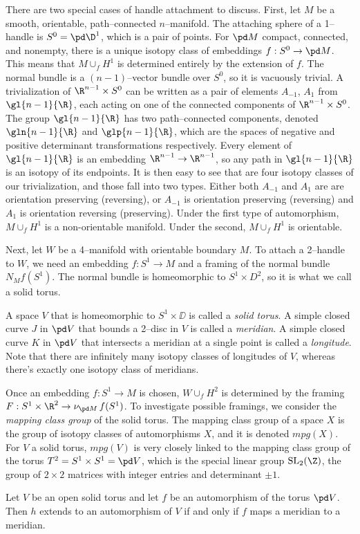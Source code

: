There are two special cases of handle attachment to discuss.
First, let $M$ be a smooth, orientable, path--connected $n$--manifold.
The attaching sphere of a 1--handle is $S^0=\pd \D^1$, which is a pair of points.
For $\pd M$ compact, connected, and nonempty, there is a unique isotopy class of embeddings $f:S^0\to\pd M$.
This means that $M\cup_f H^1$ is determined entirely by the extension of $f$.
The normal bundle is a $(n-1)$--vector bundle over $S^0$, so it is vacuously trivial.
A trivialization of $\R^{n-1}\times S^0$ can be written as a pair of elements $A_{-1}$, $A_1$ from $\gl{n-1}{\R}$, each acting on one of the connected components of $\R^{n-1}\times S^0$.
The group $\gl{n-1}{\R}$ has two path--connected components, denoted $\gln{n-1}{\R}$ and $\glp{n-1}{\R}$, which are the spaces of negative and positive determinant transformations respectively.
Every element of $\gl{n-1}{\R}$ is an embedding $\R^{n-1}\to\R^{n-1}$, so any path in $\gl{n-1}{\R}$ is an isotopy of its endpoints.
It is then easy to see that are four isotopy classes of our trivialization, and those fall into two types.
Either both $A_{-1}$ and $A_1$ are are orientation preserving (reversing), or $A_{-1}$ is orientation preserving (reversing) and $A_1$ is orientation reversing (preserving).
Under the first type of automorphism, $M\cup_f H^1$ is a non-orientable manifold.
Under the second, $M\cup_f H^1$ is orientable.

Next, let $W$ be a 4--manifold with orientable boundary $M$.
To attach a 2--handle to $W$, we need an embedding $f:S^1\to M$ and a framing of the normal bundle $N_M f(S^1)$.
The normal bundle is homeomorphic to $S^1\times D^2$, so it is what we call a solid torus.

\begin{defn}
	A space $V$ that is homeomorphic to $S^1\times\DD$ is called a \emph{solid torus}.	
	A simple closed curve $J$ in $\pd V$ that bounds a 2--disc in $V$ is called a \emph{meridian}.
	A simple closed curve $K$ in $\pd V$ that intersects a meridian at a single point is called a \emph{longitude}.
	Note that there are infinitely many isotopy classes of longitudes of $V$, whereas there's exactly one isotopy class of meridians.
\end{defn}

Once an embedding $f:S^1\to M$ is chosen, $W\cup_f H^2$ is determined by the framing $F:S^1\times \R^2\to \nu_{\pd M}\,f(S^1)$.
To investigate possible framings, we consider the \emph{mapping class group} of the solid torus.
The mapping class group of a space $X$ is the group of isotopy classes of automorphisms $X$, and it is denoted $mpg(X)$.
For $V$ a solid torus, $mpg(V)$ is very closely linked to the mapping class group of the torus $T^2 = S^1\times S^1=\pd V$, which is the special linear group $\textrm{SL}_2(\Z)$, the group of $2\times 2$ matrices with integer entries and determinant $\pm 1$.
\begin{lem}
	Let $V$ be an open solid torus and let $f$ be an automorphism of the torus $\pd V$.
	Then $h$ extends to an automorphism of $V$ if and only if $f$ maps a meridian to a meridian.	
\end{lem}

